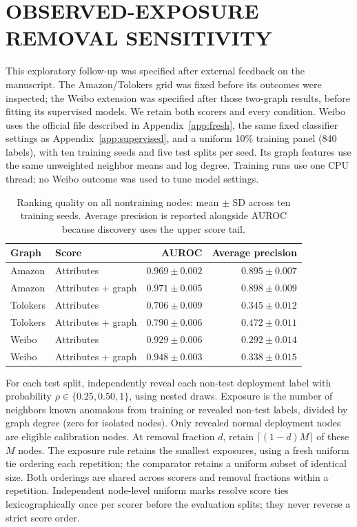 \section{OBSERVED-EXPOSURE REMOVAL SENSITIVITY}
\label{app:dose}
This exploratory follow-up was specified after external feedback on the manuscript. The Amazon/Tolokers grid was fixed before its outcomes were inspected; the Weibo extension was specified after those two-graph results, before fitting its supervised models. We retain both scorers and every condition. Weibo uses the official file described in Appendix~\ref{app:fresh}, the same fixed classifier settings as Appendix~\ref{app:supervised}, and a uniform 10\% training panel (840 labels), with ten training seeds and five test splits per seed. Its graph features use the same unweighted neighbor means and log degree. Training runs use one CPU thread; no Weibo outcome was used to tune model settings.

\begin{table}[ht]\centering\small
\caption{Ranking quality on all nontraining nodes: mean $\pm$ SD across ten training seeds. Average precision is reported alongside AUROC because discovery uses the upper score tail.}
\begin{tabular}{llrr}\toprule Graph & Score & AUROC & Average precision\\\midrule
Amazon & Attributes & $0.969\pm0.002$ & $0.895\pm0.007$ \\
Amazon & Attributes + graph & $0.971\pm0.005$ & $0.898\pm0.009$ \\
Tolokers & Attributes & $0.706\pm0.009$ & $0.345\pm0.012$ \\
Tolokers & Attributes + graph & $0.790\pm0.006$ & $0.472\pm0.011$ \\
Weibo & Attributes & $0.929\pm0.006$ & $0.292\pm0.014$ \\
Weibo & Attributes + graph & $0.948\pm0.003$ & $0.338\pm0.015$ \\
\bottomrule\end{tabular}\end{table}

For each test split, independently reveal each non-test deployment label with probability $\rho\in\{0.25,0.50,1\}$, using nested draws. Exposure is the number of neighbors known anomalous from training or revealed non-test labels, divided by graph degree (zero for isolated nodes). Only revealed normal deployment nodes are eligible calibration nodes. At removal fraction $d$, retain $\lceil(1-d)M\rceil$ of these $M$ nodes. The exposure rule retains the smallest exposures, using a fresh uniform tie ordering each repetition; the comparator retains a uniform subset of identical size. Both orderings are shared across scorers and removal fractions within a repetition. Independent node-level uniform marks resolve score ties lexicographically once per scorer before the evaluation splits; they never reverse a strict score order.

